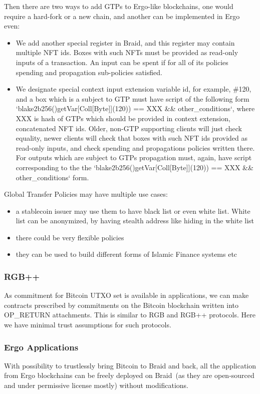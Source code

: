 \documentclass{llncs}   %
\newcommand{\authnote}[2]{\marginpar{\parbox{\marginparwidth}{\tiny %
  \textsf{#1 {\textcolor{blue}{notes: #2}}}}}%
  \textcolor{blue}{\textbf{\dag}}}
\newcommand{\authnote}[2]{
  \textsf{#1 \textcolor{blue}{: #2}}}
\newcommand{\authnote}[2]{}
\newcommand{\knote}[1]{{\authnote{\textcolor{green}{kushti notes}}{#1}}}
\newcommand{\bc}{Braid}
\begin{document}
Then there are two ways to add GTPs to Ergo-like blockchains, one would require a hard-fork or a new chain, and another can be implemented in Ergo even:

\begin{itemize}
  \item We add another special register in Braid, and this register may contain multiple NFT ids. Boxes with such NFTs must be
provided as read-only inputs of a transaction. An input can be spent if for all of its policies spending and propagation sub-policies satisfied.
  \item We designate special context input extension variable id, for example, \#120, and a box which is a subject to GTP must have script of
  the following form `blake2b256()getVar[Coll[Byte]](120)) == XXX \&\& other\_conditions`, where XXX is hash of GTPs which should be provided in context extension, concatenated NFT ids. Older, non-GTP
  supporting clients will just check equality, newer clients will check that boxes with such NFT ids provided as read-only inputs, and check spending and propagations
  policies written there. For outputs which are subject to GTPs propagation must, again, have script corresponding to the
  the `blake2b256()getVar[Coll[Byte]](120)) == XXX \&\& other\_conditions` form.
\end{itemize}


Global Transfer Policies may have multiple use cases:

\begin{itemize}
  \item a stablecoin issuer may use them to have black list or even white list. White list can be anonymized, by having stealth address like hiding in the white list
  \item there could be very flexible policies
  \item they can be used to build different forms of Islamic Finance systems etc
\end{itemize}

\subsubsection{RGB++}

As commitment for Bitcoin UTXO set is available in applications, we can make contracts prescribed by commitments on the Bitcoin blockchain  written into OP\_RETURN attachments. This is similar to RGB and RGB++ protocols. Here we have minimal trust assumptions for such protocols.

\subsubsection{Ergo Applications}

With possibility to trustlessly bring Bitcoin to \bc{} and back, all the application from Ergo blockchains can be freely deployed on \bc{}~(as they are open-sourced and under permissive license mostly) without modifications.


\newpage
\knote{add more citations throughout the text}

 
\end{document}
